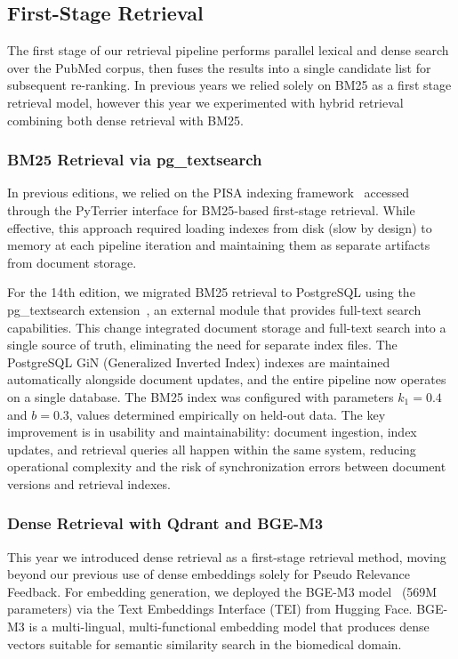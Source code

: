 \subsection{First-Stage Retrieval}
\label{sec:first-stage}

The first stage of our retrieval pipeline performs parallel lexical and dense search over the PubMed corpus, then fuses the results into a single candidate list for subsequent re-ranking. In previous years we relied solely on BM25 as a first stage retrieval model, however this year we experimented with hybrid retrieval combining both dense retrieval with BM25.

\subsubsection{BM25 Retrieval via pg\_textsearch}

In previous editions, we relied on the PISA indexing framework~\cite{mallia2019pisa} accessed through the PyTerrier interface for BM25-based first-stage retrieval. While effective, this approach required loading indexes from disk (slow by design) to memory at each pipeline iteration and maintaining them as separate artifacts from document storage.

For the 14th edition, we migrated BM25 retrieval to PostgreSQL using the pg\_textsearch extension~\cite{pgtextsearch}, an external module that provides full-text search capabilities. This change integrated document storage and full-text search into a single source of truth, eliminating the need for separate index files. The PostgreSQL GiN (Generalized Inverted Index) indexes are maintained automatically alongside document updates, and the entire pipeline now operates on a single database. The BM25 index was configured with parameters $k_1 = 0.4$ and $b = 0.3$, values determined empirically on held-out data. The key improvement is in usability and maintainability: document ingestion, index updates, and retrieval queries all happen within the same system, reducing operational complexity and the risk of synchronization errors between document versions and retrieval indexes.

\subsubsection{Dense Retrieval with Qdrant and BGE-M3}

This year we introduced dense retrieval as a first-stage retrieval method, moving beyond our previous use of dense embeddings solely for Pseudo Relevance Feedback. For embedding generation, we deployed the BGE-M3 model~\cite{chen2024bge} (569M parameters) via the Text Embeddings Interface (TEI) from Hugging Face. BGE-M3 is a multi-lingual, multi-functional embedding model that produces dense vectors suitable for semantic similarity search in the biomedical domain.

